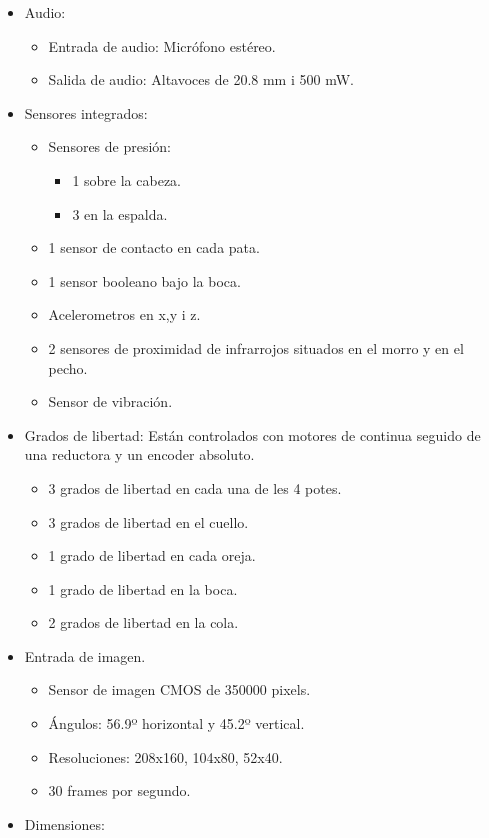 \documentclass[12pt,a4paper,final,twoside]{book}
\begin{document}
\begin{multicols}{2}
\begin{itemize}
\item Audio:
\begin{itemize}
\item Entrada de audio: Micrófono estéreo.
\item Salida de audio: Altavoces de 20.8 mm i 500 mW.
\end{itemize}
\item Sensores integrados:
\begin{itemize}
\item Sensores de presión:
\begin{itemize}
\item 1 sobre la cabeza.
\item 3 en la espalda.
\end{itemize}
\item 1 sensor de contacto en cada pata. 
\item 1 sensor booleano bajo la boca.
\item Acelerometros en x,y i z.
\item 2 sensores de proximidad de infrarrojos situados en el morro y en el pecho.
\item Sensor de vibración.
\end{itemize}
\item Grados de libertad: Están controlados con motores de continua seguido de una reductora y un encoder absoluto.
\begin{itemize}
\item 3 grados de libertad en cada una de les 4 potes.
\item 3 grados de libertad en el cuello.
\item 1 grado de libertad en cada oreja.
\item 1 grado de libertad en la boca.
\item 2 grados de libertad en la cola. 
\end{itemize}
\item Entrada de imagen.
\begin{itemize}
\item Sensor de imagen CMOS de 350000 pixels.
\item Ángulos: 56.9º horizontal y 45.2º vertical.
\item Resoluciones: 208x160, 104x80, 52x40.
\item 30 frames por segundo.
\end{itemize}
\item Dimensiones:

\end{itemize}
\end{multicols}
\end{document}
